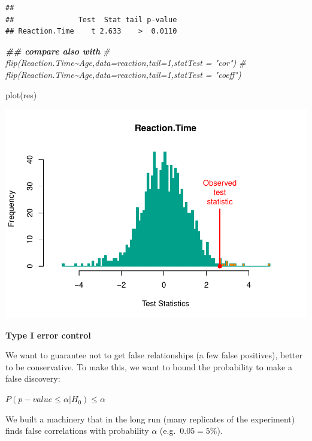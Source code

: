 \documentclass[
]{article}
\newenvironment{Shaded}{\begin{snugshade}}{\end{snugshade}}
\newcommand{\CommentTok}[1]{\textcolor[rgb]{0.56,0.35,0.01}{\textit{#1}}}
\newcommand{\DocumentationTok}[1]{\textcolor[rgb]{0.56,0.35,0.01}{\textbf{\textit{#1}}}}
\newcommand{\FunctionTok}[1]{\textcolor[rgb]{0.00,0.00,0.00}{#1}}
\newcommand{\NormalTok}[1]{#1}
\begin{document}
\begin{verbatim}
## 
##               Test  Stat tail p-value
## Reaction.Time    t 2.633    >  0.0110
\end{verbatim}

\begin{Shaded}
\begin{Highlighting}[]
\DocumentationTok{\#\# compare also with}
\CommentTok{\# flip(Reaction.Time\textasciitilde{}Age,data=reaction,tail=1,statTest = "cor")}
\CommentTok{\# flip(Reaction.Time\textasciitilde{}Age,data=reaction,tail=1,statTest = "coeff")}
\end{Highlighting}
\end{Shaded}

\begin{Shaded}
\begin{Highlighting}[]
\FunctionTok{plot}\NormalTok{(res)}
\end{Highlighting}
\end{Shaded}

\begin{center}\includegraphics{perm_files/figure-latex/unnamed-chunk-14-1} \end{center}

\textbf{Type I error control}

We want to guarantee not to get false relationships (a few false
positives), better to be conservative. To make this, we want to bound
the probability to make a false discovery:

\(P (p-value \leq \alpha | H_0) \leq \alpha\)

We built a machinery that in the long run (many replicates of the
experiment) finds false correlations with probability \(\alpha\)
(e.g.~\(0.05=5\%\)).
\end{document}
